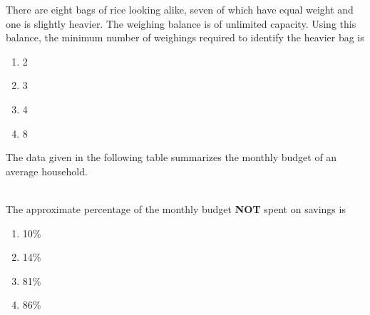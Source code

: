 \item There are eight bags of rice looking alike, seven of which have equal weight and one is slightly heavier. The weighing balance is of unlimited capacity. Using this balance, the minimum number of weighings required to identify the heavier bag is
  \begin{enumerate}
   \item 2
   \item 3
   \item 4
   \item 8 \\
\end{enumerate}
\item The data given in the following table summarizes the monthly budget of an average household.
\begin{table}[h!]
  \centering
  
\end{table} \\
The approximate percentage of the monthly budget \textbf{NOT} spent on savings is
\begin{enumerate}
    \item 10\%
    \item 14\%
    \item 81\%
    \item 86\%
\end{enumerate}
